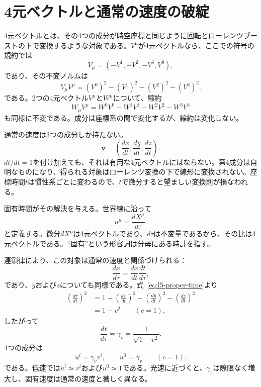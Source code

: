 \section{4元ベクトルと通常の速度の破綻}

4元ベクトルとは、その4つの成分が時空座標と同じように回転とローレンツブーストの下で変換するような対象である。\(V^\mu\)が4元ベクトルなら、ここでの符号の規約では
\begin{equation}
V_\mu=(-V^1,-V^2,-V^3,V^0),
\end{equation}
であり、その不変ノルムは
\begin{equation}
V_\mu V^\mu=(V^0)^2-(V^1)^2-(V^2)^2-(V^3)^2.
\end{equation}
である。2つの4元ベクトル\(V^\mu\)と\(W^\mu\)について、縮約
\begin{equation}
W_\mu V^\mu
=W^0V^0-W^1V^1-W^2V^2-W^3V^3
\end{equation}
も同様に不変である。成分は座標系の間で変化するが、縮約は変化しない。

通常の速度は3つの成分しか持たない。
\begin{equation}
\mathbf v=\left(\frac{dx}{dt},\frac{dy}{dt},\frac{dz}{dt}\right).
\end{equation}
\(dt/dt=1\)を付け加えても、それは有用な4元ベクトルにはならない。第4成分は自明なものになり、得られる対象はローレンツ変換の下で線形に変換されない。座標時間\(t\)は慣性系ごとに変わるので、\(t\)で微分すると望ましい変換則が損なわれる。

固有時間がその解決を与える。世界線に沿って
\begin{equation}
u^\mu=\frac{dX^\mu}{d\tau}.
\label{eq:l5-four-velocity}
\end{equation}
と定義する。微分\(dX^\mu\)は4元ベクトルであり、\(d\tau\)は不変量であるから、その比は4元ベクトルである。``固有''という形容詞は分母にある時計を指す。

連鎖律により、この対象は通常の速度と関係づけられる：
\begin{equation}
\frac{dx}{d\tau}=\frac{dx}{dt}\frac{dt}{d\tau},
\end{equation}
であり、\(y\)および\(z\)についても同様である。式~\eqref{eq:l5-proper-time}より
\begin{align}
\left(\frac{d\tau}{dt}\right)^2
&=1-\left(\frac{dx}{dt}\right)^2
    -\left(\frac{dy}{dt}\right)^2
    -\left(\frac{dz}{dt}\right)^2\nonumber\\
&=1-v^2
\qquad(c=1),
\end{align}
したがって
\begin{equation}
\frac{dt}{d\tau}=\gamma_v=\frac{1}{\sqrt{1-v^2}}.
\end{equation}
4つの成分は
\begin{equation}
u^i=\gamma_v v^i,
\qquad
u^0=\gamma_v
\qquad(c=1).
\label{eq:l5-four-velocity-components}
\end{equation}
である。低速では\(u^i\simeq v^i\)および\(u^0\simeq1\)である。光速に近づくと、\(\gamma_v\)は際限なく増大し、固有速度は通常の速度と著しく異なる。

